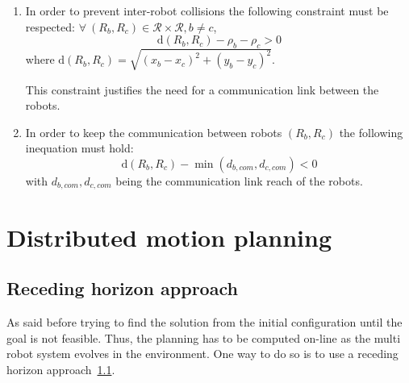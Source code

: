 \documentclass[eprint]{actapoly}
\begin{document}
\begin{enumerate}
    \item 
    In order to prevent inter-robot collisions the following constraint must be respected:
    $\forall\ (R_b, R_c) \in \mathcal{R} \times \mathcal{R}, b\neq c$,
    \begin{equation}
	    \mathrm{d}(R_b,R_c) - \rho_b -\rho_c > 0
    \end{equation}
    where $\mathrm{d}(R_b,R_c) = \sqrt{(x_{b} - x_{c})^2 + (y_{b} - y_{c})^2}$.
    
    This constraint justifies the need for a communication link between the robots.
    
    \item In order to keep the communication between robots $(R_b, R_c)$ the
    following inequation must hold:
    \begin{equation}
    	\mathrm{d}(R_b,R_c)  - \min(d_{b,com}, d_{c,com}) < 0
    \end{equation}
    with $d_{b,com}, d_{c,com}$ being the communication link reach of the robots.
\end{enumerate}
\newpage
\mbox{}\newpage



\section{Distributed motion planning}



\subsection{Receding horizon approach}


As said before trying to find the solution from the initial configuration
until the goal is not feasible. Thus, the planning has to be computed on-line
as the multi robot system evolves in the environment.
One way to do so is to use a receding horizon approach~\ref{}.
\end{document}
